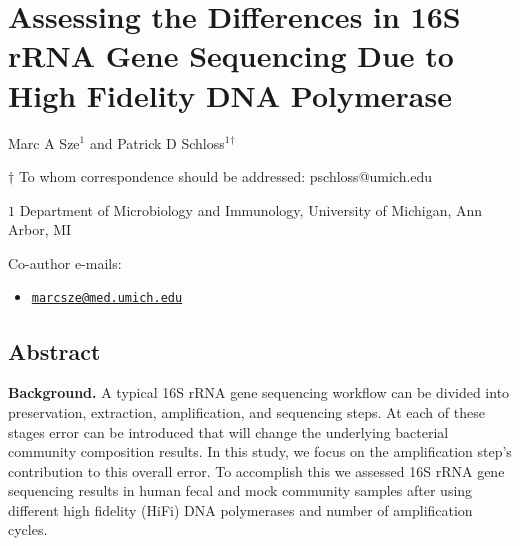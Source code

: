 \documentclass[11pt,]{article}
\title{}
\author{}
\date{}
\providecommand{\tightlist}{%
  \setlength{\itemsep}{0pt}\setlength{\parskip}{0pt}}
\begin{document}
\section{Assessing the Differences in 16S rRNA Gene Sequencing Due to
High Fidelity DNA
Polymerase}\label{assessing-the-differences-in-16s-rrna-gene-sequencing-due-to-high-fidelity-dna-polymerase}

\begin{center}
\vspace{25mm}

Marc A Sze${^1}$ and Patrick D Schloss${^1}$${^\dagger}$

\vspace{20mm}

$\dagger$ To whom correspondence should be addressed: pschloss@umich.edu

$1$ Department of Microbiology and Immunology, University of Michigan, Ann Arbor, MI




\end{center}

Co-author e-mails:

\begin{itemize}
\tightlist
\item
  \href{mailto:marcsze@med.umich.edu}{\nolinkurl{marcsze@med.umich.edu}}
\end{itemize}

\newpage

\linenumbers

\subsection{Abstract}\label{abstract}

\textbf{Background.} A typical 16S rRNA gene sequencing workflow can be
divided into preservation, extraction, amplification, and sequencing
steps. At each of these stages error can be introduced that will change
the underlying bacterial community composition results. In this study,
we focus on the amplification step's contribution to this overall error.
To accomplish this we assessed 16S rRNA gene sequencing results in human
fecal and mock community samples after using different high fidelity
(HiFi) DNA polymerases and number of amplification cycles.
\end{document}
